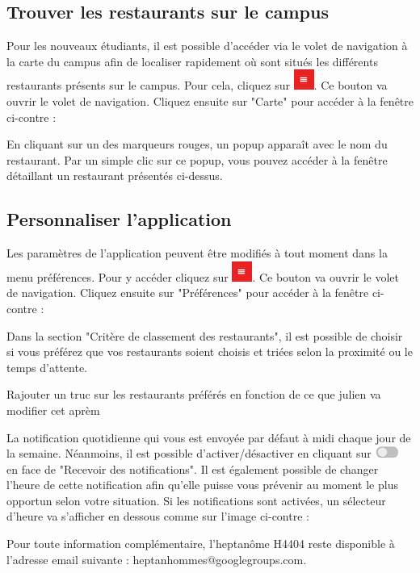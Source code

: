 \subsection{Trouver les restaurants sur le campus}
Pour les nouveaux étudiants, il est possible d'accéder via le volet de navigation
à la carte du campus afin de localiser rapidement où sont situés les différents
restaurants présents sur le campus.
Pour cela, cliquez sur \includegraphics{images/drawerButton.png}. Ce bouton va ouvrir le volet de navigation. Cliquez ensuite sur "Carte"
pour accéder à la fenêtre ci-contre : 

En cliquant sur un des marqueurs rouges, un popup apparaît avec le nom du
restaurant. Par un simple clic sur ce popup, vous pouvez accéder à la fenêtre
détaillant un restaurant présentés ci-dessus.

\subsection{Personnaliser l'application}
Les paramètres de l'application peuvent être modifiés à tout moment dans la menu
préférences. Pour y accéder cliquez sur \includegraphics{images/drawerButton.png}.
Ce bouton va ouvrir le volet de navigation. Cliquez ensuite sur "Préférences"
pour accéder à la fenêtre ci-contre : 

Dans la section "Critère de classement des restaurants", il est possible de choisir si vous 
préférez que vos restaurants soient choisis et triées selon la proximité ou le temps 
d'attente.

Rajouter un truc sur les restaurants préférés en fonction de ce que julien va modifier
cet aprèm

La notification quotidienne qui vous est envoyée par défaut à midi chaque 
jour de la semaine. Néanmoins, il est possible d'activer/désactiver  en cliquant sur 
\includegraphics{images/onoff.png} en face de "Recevoir des notifications". 
Il est également possible de changer l'heure de cette notification
afin qu'elle puisse vous prévenir au moment le plus opportun selon votre situation. 
Si les notifications sont activées, un sélecteur d'heure va s'afficher en dessous comme 
sur l'image ci-contre : 


Pour toute information complémentaire, l'heptanôme H4404 reste disponible
à l'adresse email suivante : heptanhommes@googlegroups.com. 
